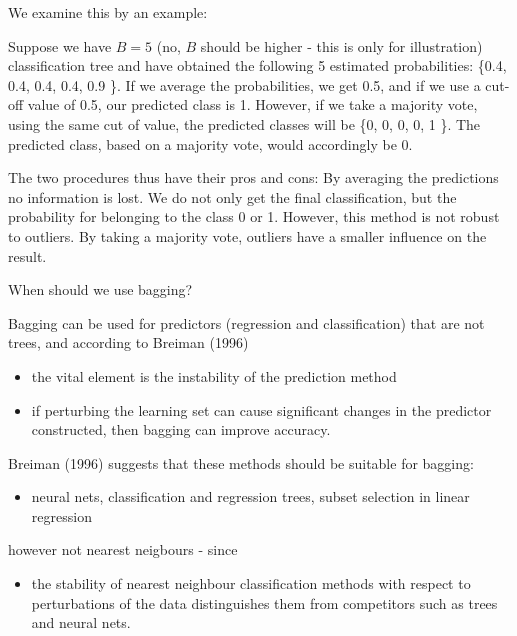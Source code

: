 \documentclass[10pt,ignorenonframetext,]{beamer}
\providecommand{\tightlist}{%
  \setlength{\itemsep}{0pt}\setlength{\parskip}{0pt}}
\begin{document}
\begin{frame}

We examine this by an example:

Suppose we have \(B=5\) (no, \(B\) should be higher - this is only for
illustration) classification tree and have obtained the following 5
estimated probabilities: \{0.4, 0.4, 0.4, 0.4, 0.9 \}. If we average the
probabilities, we get 0.5, and if we use a cut-off value of 0.5, our
predicted class is 1. However, if we take a majority vote, using the
same cut of value, the predicted classes will be \{0, 0, 0, 0, 1 \}. The
predicted class, based on a majority vote, would accordingly be 0.

The two procedures thus have their pros and cons: By averaging the
predictions no information is lost. We do not only get the final
classification, but the probability for belonging to the class 0 or 1.
However, this method is not robust to outliers. By taking a majority
vote, outliers have a smaller influence on the result.

\end{frame}

\begin{frame}

\begin{block}{When should we use bagging?}

Bagging can be used for predictors (regression and classification) that
are not trees, and according to Breiman (1996)

\begin{itemize}
\tightlist
\item
  the vital element is the instability of the prediction method
\item
  if perturbing the learning set can cause significant changes in the
  predictor constructed, then bagging can improve accuracy.
\end{itemize}

Breiman (1996) suggests that these methods should be suitable for
bagging:

\begin{itemize}
\tightlist
\item
  neural nets, classification and regression trees, subset selection in
  linear regression
\end{itemize}

however not nearest neigbours - since

\begin{itemize}
\tightlist
\item
  the stability of nearest neighbour classification methods with respect
  to perturbations of the data distinguishes them from competitors such
  as trees and neural nets.
\end{itemize}

\end{block}

\end{frame}
\end{document}

